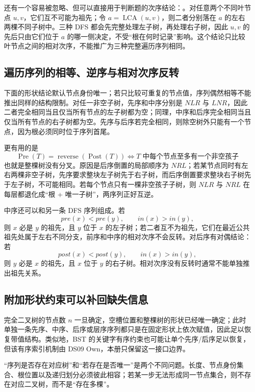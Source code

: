 \documentclass[UTF8,fontset=none,11pt,a4paper]{ctexart}
\begin{document}
还有一个容易被忽略、但可以直接用于判断题的次序结论：。对任意两个不同叶节点 $u,v$，它们互不可能为祖先；令 $a=\operatorname{LCA}(u,v)$，则二者分别落在 $a$ 的左右两棵不同子树中。三种 DFS 都会先完整处理左子树，再处理右子树，因此 $u,v$ 的先后只由它们位于 $a$ 的哪一侧决定，不受“根在何时记录”影响。这个结论只比较叶节点之间的相对次序，不能推广为三种完整遍历序列相同。

\subsection{遍历序列的相等、逆序与相对次序反转}
下面的形状结论默认节点身份唯一；若只比较可重复的节点值，序列偶然相等不能推出同样的结构限制。对任一非空子树，先序和中序分别是 $NLR$ 与 $LNR$，因此二者完全相同当且仅当所有节点的左子树都为空；同理，中序和后序完全相同当且仅当所有节点的右子树都为空。先序与后序若完全相同，则除空树外只能有一个节点，因为根必须同时位于序列首尾。

更有用的是
\[
\boxed{\operatorname{Pre}(T)=\operatorname{reverse}(\operatorname{Post}(T))
\iff T\text{ 中每个节点至多有一个非空孩子}}
\]
也就是整棵树没有分叉。原因是后序倒置的局部顺序为 $NRL$；若某节点同时有左右两棵非空子树，先序要求整块左子树先于右子树，而后序倒置要求整块右子树先于左子树，不可能相同。若每个节点只有一棵非空孩子子树，则 $NLR$ 与 $NRL$ 在每层都退化成“根 + 唯一子树”，两序列正好互逆。

中序还可以和另一条 DFS 序列组成。若
\[
pre(x)<pre(y),\qquad in(x)>in(y),
\]
则 $x$ 必是 $y$ 的祖先，且 $y$ 位于 $x$ 的左子树；若二者互不为祖先，它们在最近公共祖先处属于左右不同分支，前序和中序的相对次序不会反转。对后序有对偶结论：若
\[
post(x)<post(y),\qquad in(x)>in(y),
\]
则 $y$ 必是 $x$ 的祖先，且 $x$ 位于 $y$ 的右子树。相对次序没有反转时通常不能单独推出祖先关系。

\subsection{附加形状约束可以补回缺失信息}
完全二叉树的节点数 $n$ 一旦确定，空槽位置和整棵树的形状已经唯一确定；此时单独一条先序、中序、后序或层序序列都只是在固定形状上依次赋值，因此足以恢复带值结构。类似地，BST 的关键字有序约束也可能让单个先序/后序足以恢复，但该有序索引机制由 DS09 Own，本册只保留这一接口边界。

“序列是否存在对应树”和“若存在是否唯一”是两个不同问题。长度、节点身份集合、根位置以及递归划分必须彼此相容；若某一步无法形成同一节点集合，则不存在对应二叉树，而不是“存在多棵”。
\end{document}
